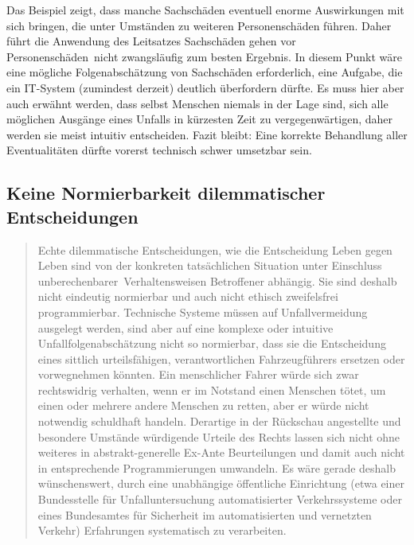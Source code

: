 \documentclass[twoside,a4paper,12pt]{article}
\begin{document}
Das Beispiel zeigt, dass manche Sachschäden eventuell enorme Auswirkungen mit sich bringen, die unter Umständen zu weiteren Personenschäden führen. Daher führt die
Anwendung des Leitsatzes \glqq Sachschäden gehen vor Personenschäden\grqq\ nicht zwangsläufig zum besten Ergebnis. In diesem Punkt wäre eine mögliche Folgenabschätzung von Sachschäden erforderlich, eine Aufgabe, die ein IT-System (zumindest derzeit) deutlich überfordern dürfte.
Es muss hier aber auch erwähnt werden, dass selbst Menschen niemals in der Lage sind, sich alle möglichen Ausgänge eines Unfalls in kürzesten Zeit zu vergegenwärtigen, daher werden sie meist intuitiv entscheiden. Fazit bleibt: Eine korrekte Behandlung aller Eventualitäten dürfte vorerst technisch schwer umsetzbar sein.\\

\subsection{Keine Normierbarkeit dilemmatischer Entscheidungen} \label{NichtNormierbarkeitDilemmatischerEntscheidungen}

\begin{quote}
\glqq
Echte dilemmatische Entscheidungen, wie die Entscheidung Leben gegen Leben sind von
der konkreten tatsächlichen Situation unter Einschluss \glqq unberechenbarer\grqq\ Verhaltensweisen Betroffener abhängig. 
Sie sind deshalb nicht eindeutig normierbar und auch nicht
ethisch zweifelsfrei programmierbar. Technische Systeme müssen auf Unfallvermeidung
ausgelegt werden, sind aber auf eine komplexe oder intuitive Unfallfolgenabschätzung
nicht so normierbar, dass sie die Entscheidung eines sittlich urteilsfähigen, verantwortlichen Fahrzeugführers ersetzen 
oder vorwegnehmen könnten. Ein menschlicher Fahrer
würde sich zwar rechtswidrig verhalten, wenn er im Notstand einen Menschen tötet, um
einen oder mehrere andere Menschen zu retten, aber er würde nicht notwendig schuldhaft handeln. Derartige in der Rückschau 
angestellte und besondere Umstände würdigende Urteile des Rechts lassen sich nicht ohne weiteres in abstrakt-generelle 
Ex-Ante Beurteilungen und damit auch nicht in entsprechende Programmierungen umwandeln.
Es wäre gerade deshalb wünschenswert, durch eine unabhängige öffentliche Einrichtung
(etwa einer Bundesstelle für Unfalluntersuchung automatisierter Verkehrssysteme oder
eines Bundesamtes für Sicherheit im automatisierten und vernetzten Verkehr) Erfahrungen systematisch zu verarbeiten.\grqq\mbox{~\cite[S. 11]{ek}}
\end{quote}
\end{document}
